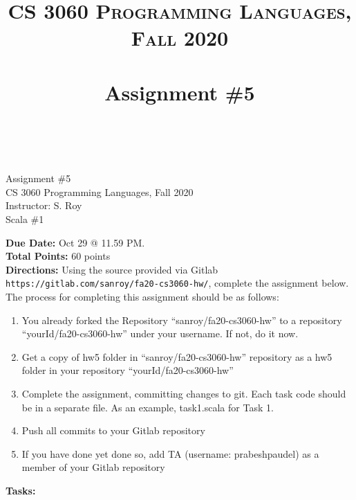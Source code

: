 \documentclass[paper=letter, fontsize=11pt]{scrartcl} %
\title{ 
    \normalfont \normalsize 
    \textsc{CS 3060 Programming Languages, Fall 2020} \\ [25pt] %
    \horrule{0.5pt} \\[0.4cm] %
    \huge Assignment \#5  \\ %
    \horrule{2pt} \\[0.5cm] %
}
\begin{document}
    \begin{center}
         Assignment \#5\\
        \small CS 3060 Programming Languages, Fall 2020 \\
        \small Instructor: S. Roy \\
        \huge Scala \#1
    \end{center}
    
    \textbf{Due Date:} Oct 29 @ 11.59 PM. \\
    \textbf{Total Points:} 60 points \\


    \textbf{Directions:} Using the source provided via Gitlab \@ \texttt{https://gitlab.com/sanroy/fa20-cs3060-hw/},
complete the assignment below. The process for completing this assignment should be as follows:

    \begin{enumerate}[noitemsep]
        \item You already forked the Repository ``sanroy/fa20-cs3060-hw'' to a repository ``yourId/fa20-cs3060-hw'' under your username. If not, do it now.
        \item Get a copy of hw5 folder in ``sanroy/fa20-cs3060-hw'' repository as a hw5 folder in your repository ``yourId/fa20-cs3060-hw''
        \item Complete the assignment, committing changes to git. Each task code should be in a separate file. As an example, task1.scala for Task 1.
        \item Push all commits to your Gitlab repository
        \item If you have done yet done so, add TA (username: prabeshpaudel) as a member of your Gitlab repository
    \end{enumerate}




    \textbf{Tasks:}
\end{document}
